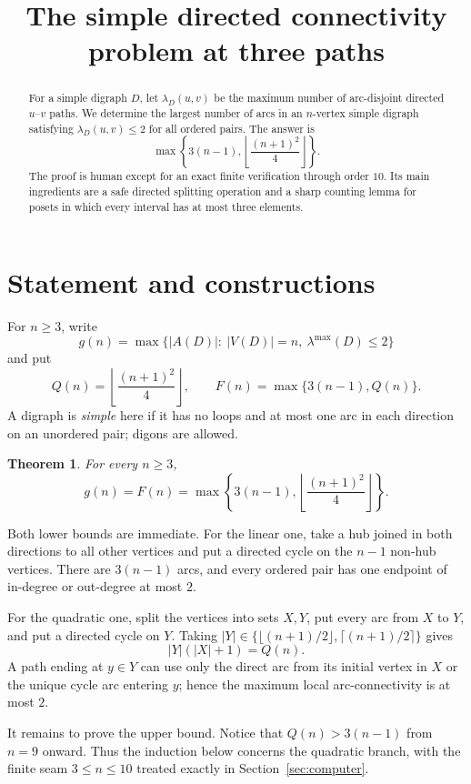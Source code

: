 \documentclass[11pt]{amsart}
\title{The simple directed connectivity problem at three paths}
\author{}
\date{}
\newtheorem{theorem}{Theorem}[section]
\theoremstyle{definition}
\newcommand{\lamax}{\lambda^{\max}}
\newcommand{\floor}[1]{\left\lfloor #1\right\rfloor}
\begin{document}
\begin{abstract}
For a simple digraph $D$, let $\lambda_D(u,v)$ be the maximum number of
arc-disjoint directed $u$--$v$ paths.  We determine the largest number of
arcs in an $n$-vertex simple digraph satisfying $\lambda_D(u,v)\le 2$ for
all ordered pairs.  The answer is
\[
 \max\left\{3(n-1),\floor{\frac{(n+1)^2}{4}}\right\}.
\]
The proof is human except for an exact finite verification through order
$10$.  Its main ingredients are a safe directed splitting operation and a
sharp counting lemma for posets in which every interval has at most three
elements.
\end{abstract}

\maketitle

\section{Statement and constructions}

For $n\ge 3$, write
\[
 g(n)=\max\bigl\{|A(D)|:\ |V(D)|=n,\ \lamax(D)\le 2\bigr\}
\]
and put
\[
 Q(n)=\floor{\frac{(n+1)^2}{4}},
 \qquad
 F(n)=\max\{3(n-1),Q(n)\}.
\]
A digraph is \emph{simple} here if it has no loops and at most one arc in
each direction on an unordered pair; digons are allowed.

\begin{theorem}\label{thm:main}
For every $n\ge 3$,
\[
 \boxed{g(n)=F(n)
 =\max\left\{3(n-1),\floor{\frac{(n+1)^2}{4}}\right\}.}
\]
\end{theorem}

Both lower bounds are immediate.  For the linear one, take a hub joined in
both directions to all other vertices and put a directed cycle on the
$n-1$ non-hub vertices.  There are $3(n-1)$ arcs, and every ordered pair
has one endpoint of in-degree or out-degree at most $2$.

For the quadratic one, split the vertices into sets $X,Y$, put every arc
from $X$ to $Y$, and put a directed cycle on $Y$.  Taking
$|Y|\in\{\lfloor(n+1)/2\rfloor,\lceil(n+1)/2\rceil\}$ gives
\[
 |Y|(|X|+1)=Q(n).
\]
A path ending at $y\in Y$ can use only the direct arc from its initial
vertex in $X$ or the unique cycle arc entering $y$; hence the maximum local
arc-connectivity is at most $2$.

It remains to prove the upper bound.  Notice that $Q(n)>3(n-1)$ from
$n=9$ onward.  Thus the induction below concerns the quadratic branch,
with the finite seam $3\le n\le 10$ treated exactly in
Section~\ref{sec:computer}.
\end{document}
